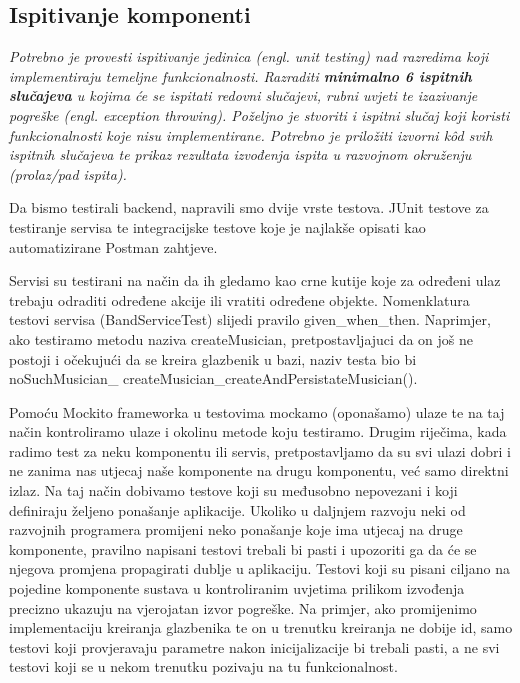 			
			\subsection{Ispitivanje komponenti}
			\textit{Potrebno je provesti ispitivanje jedinica (engl. unit testing) nad razredima koji implementiraju temeljne funkcionalnosti. Razraditi \textbf{minimalno 6 ispitnih slučajeva} u kojima će se ispitati redovni slučajevi, rubni uvjeti te izazivanje pogreške (engl. exception throwing). Poželjno je stvoriti i ispitni slučaj koji koristi funkcionalnosti koje nisu implementirane. Potrebno je priložiti izvorni kôd svih ispitnih slučajeva te prikaz rezultata izvođenja ispita u razvojnom okruženju (prolaz/pad ispita). }
			
			
			
			Da bismo testirali backend, napravili smo dvije vrste testova. JUnit testove za testiranje servisa te integracijske testove koje je najlakše opisati kao automatizirane Postman zahtjeve.
			
			Servisi su testirani na način da ih gledamo kao crne kutije koje za određeni ulaz trebaju odraditi određene akcije ili vratiti određene objekte. Nomenklatura testovi servisa (BandServiceTest) slijedi pravilo given\_when\_then. Naprimjer, ako testiramo metodu naziva createMusician, pretpostavljajuci da on još ne postoji i očekujući da se kreira glazbenik u bazi, naziv testa bio bi 
			noSuchMusician\_
			createMusician\_createAndPersistateMusician().
			
			Pomoću Mockito frameworka u testovima mockamo (oponašamo) ulaze te na taj način kontroliramo ulaze i okolinu metode koju testiramo. Drugim riječima, kada radimo test za neku komponentu ili servis, pretpostavljamo da su svi ulazi dobri i ne zanima nas utjecaj naše komponente na drugu komponentu, već samo direktni izlaz. Na taj način dobivamo testove koji su međusobno nepovezani i koji definiraju željeno ponašanje aplikacije. Ukoliko u daljnjem razvoju neki od razvojnih programera promijeni neko ponašanje koje ima utjecaj na druge komponente, pravilno napisani testovi trebali bi pasti i upozoriti ga da će se njegova promjena propagirati dublje u aplikaciju. Testovi koji su pisani ciljano na pojedine komponente sustava u kontroliranim uvjetima prilikom izvođenja precizno ukazuju na vjerojatan izvor pogreške. Na primjer, ako promijenimo implementaciju kreiranja glazbenika te on u trenutku kreiranja ne dobije id, samo testovi koji provjeravaju parametre nakon inicijalizacije bi trebali pasti, a ne svi testovi koji se u nekom trenutku pozivaju na tu funkcionalnost.
			
